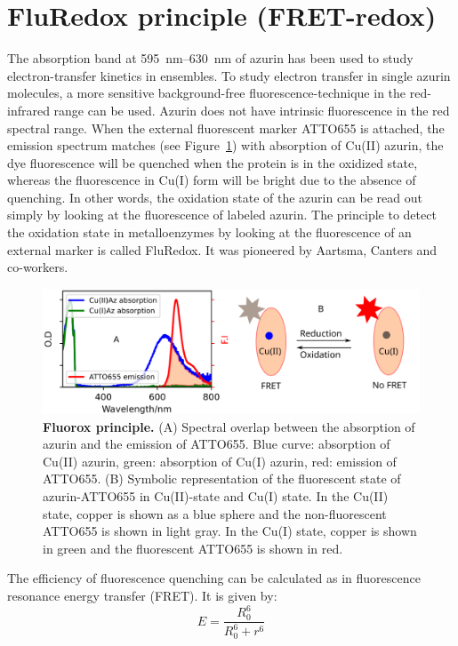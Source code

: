 \section{FluRedox principle (FRET-redox)}
The absorption band at \SIrange{595}{630}{\nm} of azurin has been used to study electron-transfer kinetics in ensembles.
To study electron transfer in single azurin molecules, a more sensitive background-free fluorescence-technique in the red-infrared range can be used.
Azurin does not have intrinsic fluorescence in the red spectral range.
When the external fluorescent marker ATTO655 is attached, the emission spectrum matches (see Figure~\ref{fig:flurox_azurin}) with absorption of Cu(II) azurin, the dye fluorescence will be quenched when the protein is in the oxidized state, whereas the fluorescence in Cu(I) form will be bright due to the absence of quenching.
In other words, the oxidation state of the azurin can be read out simply by looking at the fluorescence of labeled azurin.
The principle to detect the oxidation state in metalloenzymes by looking at the fluorescence of an external marker is called FluRedox. It was pioneered by Aartsma, Canters and co-workers.\cite{kuznetsova2008the,goldsmith2011redox,tabares2011fluorescence}
\begin{figure}
	\centering
	\includegraphics[width=\textwidth]{flurox_azurin}
	\caption{\textbf{Fluorox principle.} (A) Spectral overlap between the absorption of azurin and the emission of ATTO655. Blue curve: absorption of Cu(II) azurin, green: absorption of Cu(I) azurin, red: emission of ATTO655.
	(B) Symbolic representation of the fluorescent state of azurin-ATTO655 in Cu(II)-state and Cu(I) state. In the Cu(II) state, copper is shown as a blue sphere and the non-fluorescent ATTO655 is shown in light gray. In the Cu(I) state, copper is shown in green and the fluorescent ATTO655 is shown in red.}
	\label{fig:flurox_azurin}
\end{figure}
The efficiency of fluorescence quenching can be calculated as in fluorescence resonance energy transfer (FRET). It is given by:
\begin{equation}
	E = \frac{R_0^6}{R_0^6 + r^6}	
\end{equation}
